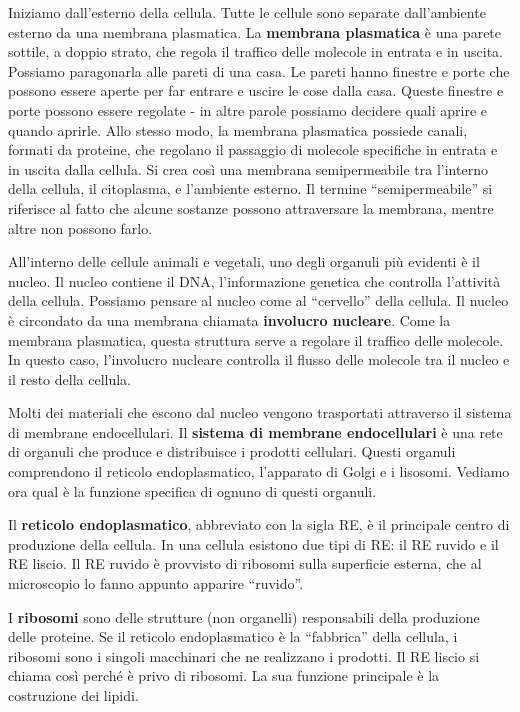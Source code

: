 \documentclass[a4paper]{article}
\begin{document}
Iniziamo dall'esterno della cellula. Tutte le cellule sono separate dall'ambiente esterno da
una membrana plasmatica. La \textbf{membrana plasmatica} è una parete sottile, a doppio strato,
che regola il traffico delle molecole in entrata e in uscita. Possiamo paragonarla alle pareti
di una casa. Le pareti hanno finestre e porte che possono essere aperte per far entrare e
uscire le cose dalla casa. Queste finestre e porte possono essere regolate - in altre parole
possiamo decidere quali aprire e quando aprirle. Allo stesso modo, la membrana plasmatica
possiede canali, formati da proteine, che regolano il passaggio di molecole specifiche in
entrata e in uscita dalla cellula. Si crea così una membrana semipermeabile tra l'interno
della cellula, il citoplasma, e l'ambiente esterno. Il termine “semipermeabile” si riferisce al
fatto che alcune sostanze possono attraversare la membrana, mentre altre non possono
farlo.

All'interno delle cellule animali e vegetali, uno degli organuli più evidenti è il nucleo. Il nucleo
contiene il DNA, l'informazione genetica che controlla l'attività della cellula. Possiamo
pensare al nucleo come al “cervello” della cellula. Il nucleo è circondato da una membrana
chiamata \textbf{involucro nucleare}. Come la membrana plasmatica, questa struttura serve a
regolare il traffico delle molecole. In questo caso, l'involucro nucleare controlla il flusso delle
molecole tra il nucleo e il resto della cellula.

Molti dei materiali che escono dal nucleo vengono trasportati attraverso il sistema di
membrane endocellulari. Il \textbf{sistema di membrane endocellulari} è una rete di organuli che
produce e distribuisce i prodotti cellulari. Questi organuli comprendono il reticolo
endoplasmatico, l'apparato di Golgi e i lisosomi. Vediamo ora qual è la funzione specifica di
ognuno di questi organuli.

Il \textbf{reticolo endoplasmatico}, abbreviato con la sigla RE, è il principale centro di produzione
della cellula. In una cellula esistono due tipi di RE: il RE ruvido e il RE liscio. Il RE ruvido è
provvisto di ribosomi sulla superficie esterna, che al microscopio lo fanno appunto apparire
“ruvido”.

I \textbf{ribosomi} sono delle strutture (non organelli) responsabili della produzione delle proteine. Se il reticolo
endoplasmatico è la “fabbrica” della cellula, i ribosomi sono i singoli macchinari che ne
realizzano i prodotti. Il RE liscio si chiama così perché è privo di ribosomi. La sua funzione
principale è la costruzione dei lipidi.
\end{document}
